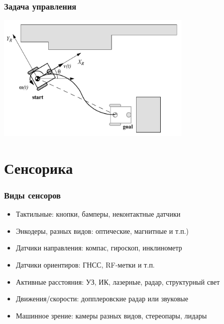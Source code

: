 \documentclass{../../slides-style}
\begin{document}
    \begin{frame}
        \frametitle{Задача управления}
        \begin{center}
            \includegraphics[width=0.7\textwidth]{inverseKinematics.png}
        \end{center}
    \end{frame}

    \section{Сенсорика}

    \begin{frame}
        \frametitle{Виды сенсоров}
        \begin{itemize}
            \item Тактильные: кнопки, бамперы, неконтактные датчики
            \item Энкодеры, разных видов: оптические, магнитные и т.п.)
            \item Датчики направления: компас, гироскоп, инклинометр
            \item Датчики ориентиров: ГНСС, RF-метки и т.п.
            \item Активные расстояния: УЗ, ИК, лазерные, радар, структурный свет
            \item Движения/скорости: допплеровские радар или звуковые
            \item Машинное зрение: камеры разных видов, стереопары, лидары
        \end{itemize}
    \end{frame}
\end{document}

